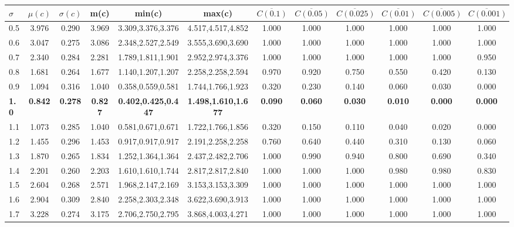\begin{table*}[h!]
\begin{center}
\begin{tabular}{| l | c | c | c | c | c | c | c | c | c | c | c |}\hline
$\sigma$ & $\mu(c)$ & $\sigma(c)$ & m(c) & min(c) & max(c) & $\overline{C(0.1)}$ & $\overline{C(0.05)}$ & $\overline{C(0.025)}$ & $\overline{C(0.01)}$ & $\overline{C(0.005)}$ & $\overline{C(0.001)}$ \\\hline\hline
0.5 & 3.976 & 0.290 & 3.969 & 3.309,3.376,3.376 & 4.517,4.517,4.852  & 1.000  & 1.000  & 1.000  & 1.000  & 1.000  & 1.000 \\\hline
0.6 & 3.047 & 0.275 & 3.086 & 2.348,2.527,2.549 & 3.555,3.690,3.690  & 1.000  & 1.000  & 1.000  & 1.000  & 1.000  & 1.000 \\\hline
0.7 & 2.340 & 0.284 & 2.281 & 1.789,1.811,1.901 & 2.952,2.974,3.376  & 1.000  & 1.000  & 1.000  & 1.000  & 1.000  & 0.950 \\\hline
0.8 & 1.681 & 0.264 & 1.677 & 1.140,1.207,1.207 & 2.258,2.258,2.594  & 0.970  & 0.920  & 0.750  & 0.550  & 0.420  & 0.130 \\\hline
0.9 & 1.094 & 0.316 & 1.040 & 0.358,0.559,0.581 & 1.744,1.766,1.923  & 0.320  & 0.230  & 0.140  & 0.060  & 0.030  & 0.000 \\\hline
{\bf 1.0} & {\bf 0.842} & {\bf 0.278} & {\bf 0.827} & {\bf 0.402,0.425,0.447} & {\bf 1.498,1.610,1.677} & {\bf 0.090} & {\bf 0.060} & {\bf 0.030} & {\bf 0.010} & {\bf 0.000} & {\bf 0.000} \\\hline
1.1 & 1.073 & 0.285 & 1.040 & 0.581,0.671,0.671 & 1.722,1.766,1.856  & 0.320  & 0.150  & 0.110  & 0.040  & 0.020  & 0.000 \\\hline
1.2 & 1.455 & 0.296 & 1.453 & 0.917,0.917,0.917 & 2.191,2.258,2.258  & 0.760  & 0.640  & 0.440  & 0.310  & 0.130  & 0.060 \\\hline
1.3 & 1.870 & 0.265 & 1.834 & 1.252,1.364,1.364 & 2.437,2.482,2.706  & 1.000  & 0.990  & 0.940  & 0.800  & 0.690  & 0.340 \\\hline
1.4 & 2.201 & 0.260 & 2.203 & 1.610,1.610,1.744 & 2.817,2.817,2.840  & 1.000  & 1.000  & 1.000  & 0.980  & 0.980  & 0.830 \\\hline
1.5 & 2.604 & 0.268 & 2.571 & 1.968,2.147,2.169 & 3.153,3.153,3.309  & 1.000  & 1.000  & 1.000  & 1.000  & 1.000  & 1.000 \\\hline
1.6 & 2.904 & 0.309 & 2.840 & 2.258,2.303,2.348 & 3.622,3.690,3.913  & 1.000  & 1.000  & 1.000  & 1.000  & 1.000  & 1.000 \\\hline
1.7 & 3.228 & 0.274 & 3.175 & 2.706,2.750,2.795 & 3.868,4.003,4.271  & 1.000  & 1.000  & 1.000  & 1.000  & 1.000  & 1.000 \\\hline

\end{tabular}
\end{center}
\end{table*}
